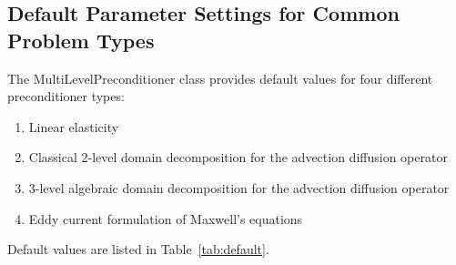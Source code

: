 \documentclass{article}[11pt]
\begin{document}
\subsection{Default Parameter Settings for Common Problem Types}
%
The MultiLevelPreconditioner class provides default values for four different
preconditioner types:
%
\begin{enumerate}
  \item Linear elasticity
  \item Classical 2-level domain decomposition for the advection diffusion operator
  \item 3-level algebraic domain decomposition for the advection diffusion operator
  \item Eddy current formulation of Maxwell's equations
\end{enumerate}
%
Default values are listed in Table~\ref{tab:default}.
\end{document}
